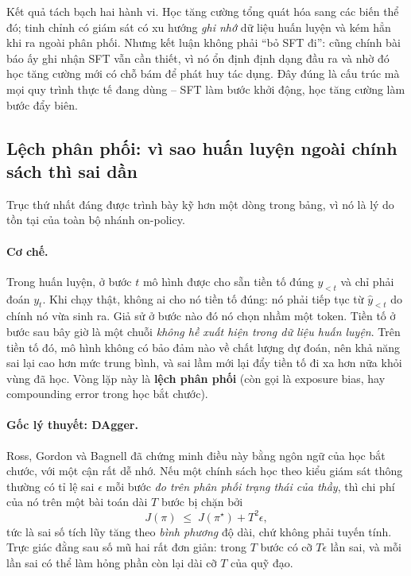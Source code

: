 Kết quả tách bạch hai hành vi. Học tăng cường tổng quát hóa sang các biến thể đó; tinh chỉnh có giám sát có xu hướng \emph{ghi nhớ} dữ liệu huấn luyện và kém hẳn khi ra ngoài phân phối. Nhưng kết luận không phải ``bỏ SFT đi'': cũng chính bài báo ấy ghi nhận SFT vẫn cần thiết, vì nó ổn định định dạng đầu ra và nhờ đó học tăng cường mới có chỗ bám để phát huy tác dụng. Đây đúng là cấu trúc mà mọi quy trình thực tế đang dùng -- SFT làm bước khởi động, học tăng cường làm bước đẩy biên.

\subsection{Lệch phân phối: vì sao huấn luyện ngoài chính sách thì sai dần}
\label{ssec:exposure_bias}

Trục thứ nhất đáng được trình bày kỹ hơn một dòng trong bảng, vì nó là lý do tồn tại của toàn bộ nhánh on-policy.

\paragraph{Cơ chế.} Trong huấn luyện, ở bước $t$ mô hình được cho sẵn tiền tố đúng $y_{<t}$ và chỉ phải đoán $y_t$. Khi chạy thật, không ai cho nó tiền tố đúng: nó phải tiếp tục từ $\hat{y}_{<t}$ do chính nó vừa sinh ra. Giả sử ở bước nào đó nó chọn nhầm một token. Tiền tố ở bước sau bây giờ là một chuỗi \emph{không hề xuất hiện trong dữ liệu huấn luyện}. Trên tiền tố đó, mô hình không có bảo đảm nào về chất lượng dự đoán, nên khả năng sai lại cao hơn mức trung bình, và sai lầm mới lại đẩy tiền tố đi xa hơn nữa khỏi vùng đã học. Vòng lặp này là \textbf{lệch phân phối} (còn gọi là exposure bias, hay compounding error trong học bắt chước).

\paragraph{Gốc lý thuyết: DAgger.} Ross, Gordon và Bagnell \cite{ross2011dagger} đã chứng minh điều này bằng ngôn ngữ của học bắt chước, với một cận rất dễ nhớ. Nếu một chính sách học theo kiểu giám sát thông thường có tỉ lệ sai $\epsilon$ mỗi bước \emph{đo trên phân phối trạng thái của thầy}, thì chi phí của nó trên một bài toán dài $T$ bước bị chặn bởi
\[
J(\pi) \;\le\; J(\pi^\star) + T^2\epsilon ,
\]
tức là sai số tích lũy tăng theo \emph{bình phương} độ dài, chứ không phải tuyến tính. Trực giác đằng sau số mũ hai rất đơn giản: trong $T$ bước có cỡ $T\epsilon$ lần sai, và mỗi lần sai có thể làm hỏng phần còn lại dài cỡ $T$ của quỹ đạo.

